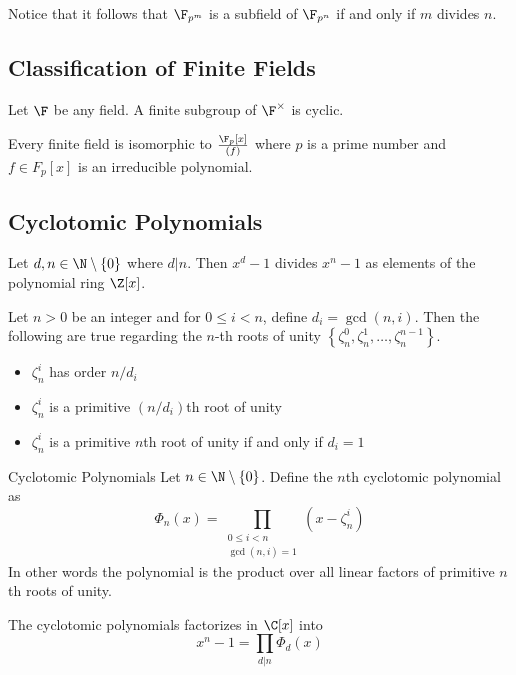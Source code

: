 \documentclass[a4paper]{article}
\begin{document}
Notice that it follows that $\F_{p^m}$ is a subfield of $\F_{p^n}$ if and only if $m$ divides $n$. 

\subsection{Classification of Finite Fields}
\begin{lmm}{}{} Let $\F$ be any field. A finite subgroup of $\F^\times$ is cyclic. 
\end{lmm}

\begin{prp}{}{} Every finite field is isomorphic to $\frac{\F_p[x]}{(f)}$ where $p$ is a prime number and $f\in F_p[x]$ is an irreducible polynomial. 
\end{prp}

\subsection{Cyclotomic Polynomials}
\begin{lmm}{}{} Let $d,n\in\N\setminus\{0\}$ where $d|n$. Then $x^d-1$ divides $x^n-1$ as elements of the polynomial ring $\Z[x]$. 
\end{lmm}

\begin{lmm}{}{} Let $n>0$ be an integer and for $0\leq i<n$, define $d_i=\gcd(n,i)$. Then the following are true regarding the $n$-th roots of unity $\left\{\zeta_n^0,\zeta_n^1,\dots,\zeta_n^{n-1}\right\}$. 
\begin{itemize}
\item $\zeta_n^i$ has order $n/d_i$
\item $\zeta_n^i$ is a primitive $(n/d_i)$th root of unity
\item $\zeta_n^i$ is a primitive $n$th root of unity if and only if $d_i=1$
\end{itemize}
\end{lmm}

\begin{defn}{Cyclotomic Polynomials}{} Let $n\in\N\setminus\{0\}$. Define the $n$th cyclotomic polynomial as $$\Phi_n(x)=\prod_{\substack{0\leq i<n\\\gcd(n,i)=1}}\left(x-\zeta_n^i\right)$$
In other words the polynomial is the product over all linear factors of primitive $n$th roots of unity. 
\end{defn}

\begin{prp}{}{} The cyclotomic polynomials factorizes in $\C[x]$ into $$x^n-1=\prod_{d|n}\Phi_d(x)$$
\end{prp}
\end{document}
